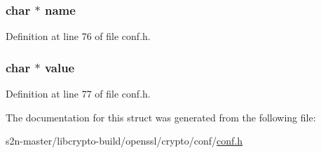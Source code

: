 \subsubsection[{\texorpdfstring{name}{name}}]{\setlength{\rightskip}{0pt plus 5cm}char $\ast$ name}\hypertarget{struct_c_o_n_f___v_a_l_u_e_ad547fb8186b526cb1b588daad4334fbe}{}\label{struct_c_o_n_f___v_a_l_u_e_ad547fb8186b526cb1b588daad4334fbe}


Definition at line 76 of file conf.\+h.

\subsubsection[{\texorpdfstring{value}{value}}]{\setlength{\rightskip}{0pt plus 5cm}char $\ast$ value}\hypertarget{struct_c_o_n_f___v_a_l_u_e_a325611b97f57f55a57b2a7cf3238ef54}{}\label{struct_c_o_n_f___v_a_l_u_e_a325611b97f57f55a57b2a7cf3238ef54}


Definition at line 77 of file conf.\+h.



The documentation for this struct was generated from the following file\+:\begin{DoxyCompactItemize}
\item 
s2n-\/master/libcrypto-\/build/openssl/crypto/conf/\hyperlink{crypto_2conf_2conf_8h}{conf.\+h}\end{DoxyCompactItemize}
